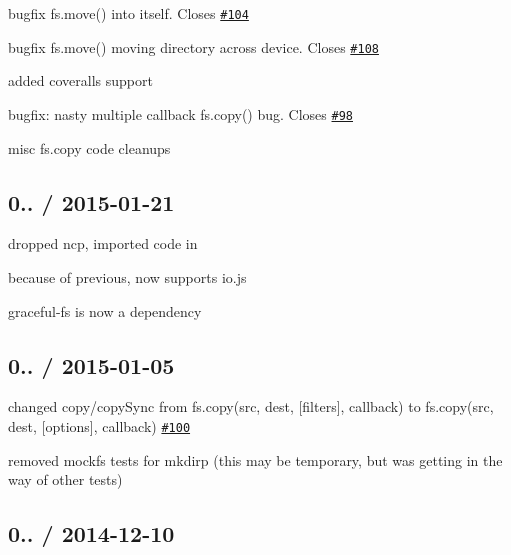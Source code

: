 \begin{DoxyItemize}
\item bugfix {\ttfamily fs.\+move()} into itself. Closes \href{https://github.com/jprichardson/node-fs-extra/issues/104}{\tt \#104}
\item bugfix {\ttfamily fs.\+move()} moving directory across device. Closes \href{https://github.com/jprichardson/node-fs-extra/issues/108}{\tt \#108}
\item added coveralls support
\item bugfix\+: nasty multiple callback {\ttfamily fs.\+copy()} bug. Closes \href{https://github.com/jprichardson/node-fs-extra/issues/98}{\tt \#98}
\item misc fs.\+copy code cleanups
\end{DoxyItemize}

\subsection*{0.. / 2015-\/01-\/21 }


\begin{DoxyItemize}
\item dropped {\ttfamily ncp}, imported code in
\item because of previous, now supports {\ttfamily io.\+js}
\item {\ttfamily graceful-\/fs} is now a dependency
\end{DoxyItemize}

\subsection*{0.. / 2015-\/01-\/05 }


\begin{DoxyItemize}
\item changed {\ttfamily copy}/{\ttfamily copy\+Sync} from {\ttfamily fs.\+copy(src, dest, \mbox{[}filters\mbox{]}, callback)} to {\ttfamily fs.\+copy(src, dest, \mbox{[}options\mbox{]}, callback)} \href{https://github.com/jprichardson/node-fs-extra/pull/100}{\tt \#100}
\item removed mockfs tests for mkdirp (this may be temporary, but was getting in the way of other tests)
\end{DoxyItemize}

\subsection*{0.. / 2014-\/12-\/10 }


